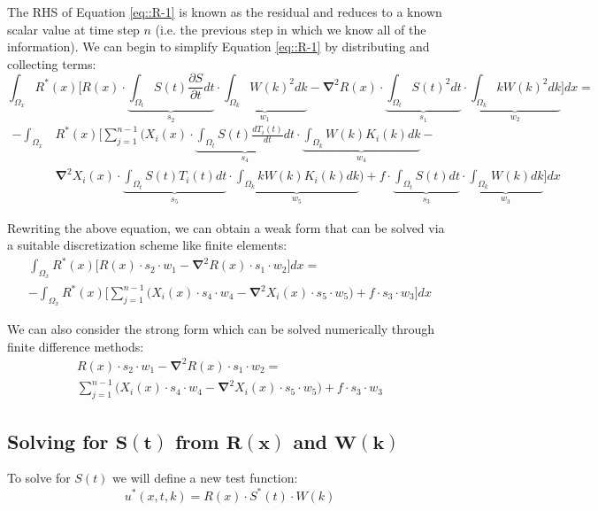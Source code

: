\documentclass{article}
\def\ds{\displaystyle}
\def\pd{\partial}
\def\grad{\mathbf\nabla}
\begin{document}
The RHS of Equation \ref{eq::R-1} is known as the residual and reduces to a known scalar value at time step $n$ (i.e. the previous step in which we know all of the information). We can begin to simplify Equation \ref{eq::R-1} by distributing and collecting terms:
\begin{equation*}
\ds\int_{\Omega_x} R^*(x) \Bigg[ R(x)\cdot \underbrace{\ds\int_{\Omega_t} S(t)\frac{\pd S}{\pd t}dt}_{s_2} \cdot \underbrace{\ds\int_{\Omega_k} W(k)^2 dk}_{w_1} - \grad^2 R(x) \cdot \underbrace{\ds\int_{\Omega_t} S(t)^2 dt}_{s_1} \cdot \underbrace{\ds\int_{\Omega_k} kW(k)^2 dk}_{w_2} \Bigg] dx =
\end{equation*}\vspace{-15pt}
\begin{align}
-\ds\int_{\Omega_x}& R^*(x) \Bigg[ \ds\sum_{j=1}^{n-1} \bigg(X_i(x) \cdot \underbrace{\ds\int_{\Omega_t} S(t)\frac{dT_i(t)}{dt} dt}_{s_4} \cdot \underbrace{\ds\int_{\Omega_k}W(k)K_i(k) dk}_{w_4} - \nonumber \\
& \grad^2X_i(x) \cdot \underbrace{\ds\int_{\Omega_t}S(t)T_i(t) dt}_{s_5} \cdot \underbrace{\ds\int_{\Omega_k}kW(k)K_i(k)dk}_{w_5} \bigg) + f \cdot \underbrace{\ds\int_{\Omega_t} S(t) dt}_{s_3} \cdot \underbrace{\ds\int_{\Omega_k} W(k)dk}_{w_3} \Bigg] dx
\end{align}

Rewriting the above equation, we can obtain a weak form that can be solved via a suitable discretization scheme like finite elements:
\begin{gather}
\ds\int_{\Omega_x} R^*(x) \Bigg[ R(x)\cdot s_2 \cdot w_1 - \grad^2 R(x) \cdot s_1 \cdot w_2 \Bigg] dx = \nonumber \\
 -  \ds\int_{\Omega_x} R^*(x) \Bigg[ \ds\sum_{j=1}^{n-1} \bigg(X_i(x) \cdot s_4 \cdot w_4 - \grad^2X_i(x) \cdot s_5 \cdot w_5 \bigg) + f \cdot s_3 \cdot w_3 \Bigg] dx
\end{gather}

We can also consider the strong form which can be solved numerically through finite difference methods:
\begin{gather}
\label{eq::R-strong}
R(x)\cdot s_2 \cdot w_1 - \grad^2 R(x) \cdot s_1 \cdot w_2 =  \nonumber \\
\ds\sum_{j=1}^{n-1} \bigg(X_i(x) \cdot s_4 \cdot w_4 - \grad^2X_i(x) \cdot s_5 \cdot w_5 \bigg) + f \cdot s_3 \cdot w_3
\end{gather}

\subsection{Solving for $\mathbf{S(t)}$ from $\mathbf{R(x)}$ and $\mathbf{W(k)}$}
To solve for $S(t)$ we will define a new test function:
\begin{equation}
\label{eq::R-TestFctn-2}
u^*(x,t,k) = R(x) \cdot S^*(t) \cdot W(k)
\end{equation}
\end{document}
